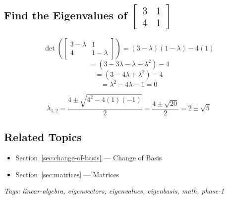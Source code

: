 \subsection{Find the Eigenvalues of $\begin{bmatrix} 3 & 1 \\ 4 & 1 \end{bmatrix}$}

\[
\det\left(\begin{bmatrix} 3-\lambda & 1 \\ 4 & 1-\lambda \end{bmatrix}\right) = (3-\lambda)(1-\lambda) - 4(1)
\]
\[
= (3 - 3\lambda - \lambda + \lambda^2) - 4
\]
\[
= (3 - 4\lambda + \lambda^2) - 4
\]
\[
= \lambda^2 - 4\lambda - 1 = 0
\]

\[
\lambda_{1,2} = \frac{4 \pm \sqrt{4^2 - 4(1)(-1)}}{2} = \frac{4 \pm \sqrt{20}}{2} = 2 \pm \sqrt{5}
\]

\subsection*{Related Topics}
\begin{itemize}[nosep]
  \item Section~\ref{sec:change-of-basis} --- Change of Basis
  \item Section~\ref{sec:matrices} --- Matrices
\end{itemize}

\bigskip
\noindent\textit{Tags: linear-algebra, eigenvectors, eigenvalues, eigenbasis, math, phase-1}
